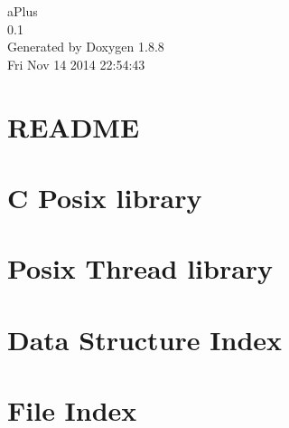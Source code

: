 \documentclass[twoside]{book}
\newcommand{\+}{\discretionary{\mbox{\scriptsize$\hookleftarrow$}}{}{}}
\newcommand{\clearemptydoublepage}{%
  \newpage{\pagestyle{empty}\cleardoublepage}%
}
\begin{document}
\hypersetup{pageanchor=false,
             bookmarks=true,
             bookmarksnumbered=true,
             pdfencoding=unicode
            }
\begin{titlepage}
\vspace*{7cm}
\begin{center}%
{\Large a\+Plus \\[1ex]\large 0.\+1 }\\
\vspace*{1cm}
{\large Generated by Doxygen 1.8.8}\\
\vspace*{0.5cm}
{\small Fri Nov 14 2014 22:54:43}\\
\end{center}
\end{titlepage}
\clearemptydoublepage
\tableofcontents
\clearemptydoublepage
{}
\hypersetup{pageanchor=true}

\chapter{R\+E\+A\+D\+M\+E}
\label{md_README}
\hypertarget{md_README}{}

\chapter{C Posix library}
\label{md_usr_src_libposix_README}
\hypertarget{md_usr_src_libposix_README}{}

\chapter{Posix Thread library}
\label{md_usr_src_libpthread_README}
\hypertarget{md_usr_src_libpthread_README}{}

\chapter{Data Structure Index}

\chapter{File Index}

\end{document}
